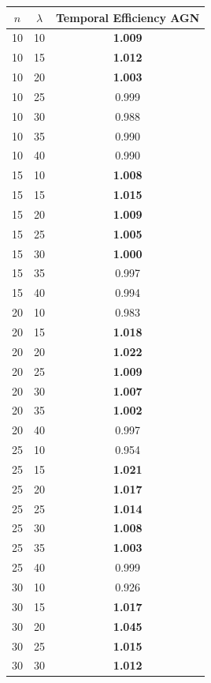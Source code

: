 \begin{table}
  \centering
  \begin{tabular}{|c|c|c|}
    \hline
    $n$ & $\lambda$ & Temporal Efficiency \textsc{AGN} \\
    \hline
    \hline
10 & 10 & \textbf{1.009} \\
\hline
10 & 15 & \textbf{1.012} \\
\hline
10 & 20 & \textbf{1.003} \\
\hline
10 & 25 & 0.999 \\
\hline
10 & 30 & 0.988 \\
\hline
10 & 35 & 0.990 \\
\hline
10 & 40 & 0.990 \\
\hline
15 & 10 & \textbf{1.008} \\
\hline
15 & 15 & \textbf{1.015} \\
\hline
15 & 20 & \textbf{1.009} \\
\hline
15 & 25 & \textbf{1.005} \\
\hline
15 & 30 & \textbf{1.000} \\
\hline
15 & 35 & 0.997 \\
\hline
15 & 40 & 0.994 \\
\hline
20 & 10 & 0.983 \\
\hline
20 & 15 & \textbf{1.018} \\
\hline
20 & 20 & \textbf{1.022} \\
\hline
20 & 25 & \textbf{1.009} \\
\hline
20 & 30 & \textbf{1.007} \\
\hline
20 & 35 & \textbf{1.002} \\
\hline
20 & 40 & 0.997 \\
\hline
25 & 10 & 0.954 \\
\hline
25 & 15 & \textbf{1.021} \\
\hline
25 & 20 & \textbf{1.017} \\
\hline
25 & 25 & \textbf{1.014} \\
\hline
25 & 30 & \textbf{1.008} \\
\hline
25 & 35 & \textbf{1.003} \\
\hline
25 & 40 & 0.999 \\
\hline
30 & 10 & 0.926 \\
\hline
30 & 15 & \textbf{1.017} \\
\hline
30 & 20 & \textbf{1.045} \\
\hline
30 & 25 & \textbf{1.015} \\
\hline
30 & 30 & \textbf{1.012} \\

\end{tabular}
\end{table}
